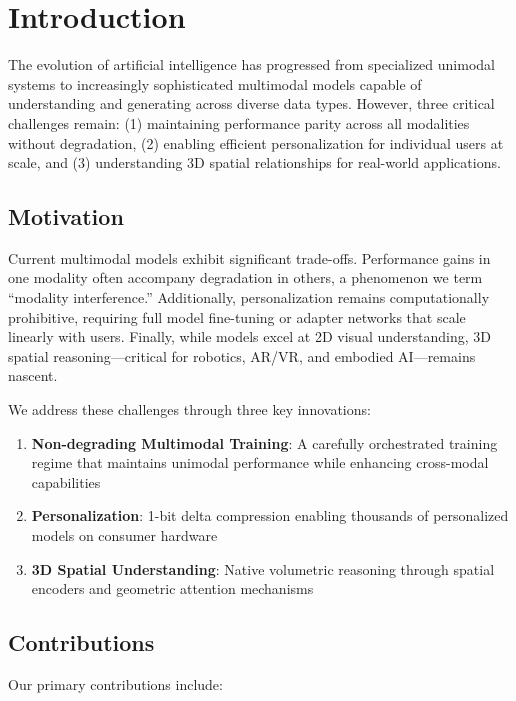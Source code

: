 \section{Introduction}

The evolution of artificial intelligence has progressed from specialized unimodal systems to increasingly sophisticated multimodal models capable of understanding and generating across diverse data types. However, three critical challenges remain: (1) maintaining performance parity across all modalities without degradation, (2) enabling efficient personalization for individual users at scale, and (3) understanding 3D spatial relationships for real-world applications.

\subsection{Motivation}

Current multimodal models exhibit significant trade-offs. Performance gains in one modality often accompany degradation in others, a phenomenon we term ``modality interference.'' Additionally, personalization remains computationally prohibitive, requiring full model fine-tuning or adapter networks that scale linearly with users. Finally, while models excel at 2D visual understanding, 3D spatial reasoning—critical for robotics, AR/VR, and embodied AI—remains nascent.

We address these challenges through three key innovations:
\begin{enumerate}
    \item \textbf{Non-degrading Multimodal Training}: A carefully orchestrated training regime that maintains unimodal performance while enhancing cross-modal capabilities
    \item \textbf{\bitdelta{} Personalization}: 1-bit delta compression enabling thousands of personalized models on consumer hardware
    \item \textbf{3D Spatial Understanding}: Native volumetric reasoning through spatial encoders and geometric attention mechanisms
\end{enumerate}

\subsection{Contributions}

Our primary contributions include:

